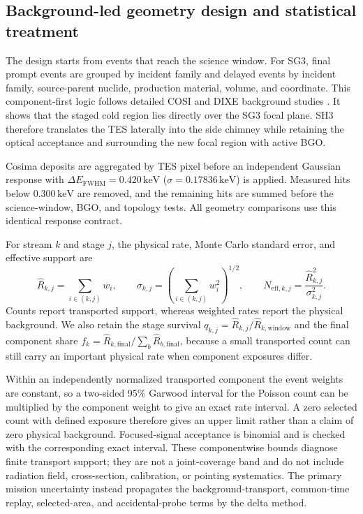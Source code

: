 \documentclass[11pt]{article}
\newcommand{\keV}{\ensuremath{\,\mathrm{keV}}}
\begin{document}
\subsection{Background-led geometry design and statistical treatment}
\label{subsec:comparison_hierarchy}

The design starts from events that reach the science window. For SG3, final
prompt events are grouped by incident family and delayed events by incident
family, source-parent nuclide, production material, volume, and coordinate. This
component-first logic follows detailed COSI and DIXE background studies
\cite{Gallego2025Balloon,Tian2026DIXE}. It shows that the staged cold region lies
directly over the SG3 focal plane. SH3 therefore translates the TES laterally
into the side chimney while retaining the optical acceptance and surrounding the
new focal region with active BGO.

Cosima deposits are aggregated by TES pixel before an independent Gaussian
response with $\Delta E_{\mathrm{FWHM}}=0.420\keV$
($\sigma=0.17836\keV$) is applied. Measured hits below 0.300\keV{} are removed,
and the remaining hits are summed before the science-window, BGO, and topology
tests. All geometry comparisons use this identical response contract.

For stream $k$ and stage $j$, the physical rate, Monte Carlo standard error, and
effective support are
\begin{equation}
  \widehat R_{k,j}=\sum_{i\in(k,j)}w_i,\qquad
  \sigma_{k,j}=\left(\sum_{i\in(k,j)}w_i^2\right)^{1/2},\qquad
  N_{\mathrm{eff},k,j}=\frac{\widehat R_{k,j}^2}{\sigma_{k,j}^2}.
  \label{eq:weighted_rate_stats}
\end{equation}
Counts report transported support, whereas weighted rates report the physical
background. We also retain the stage survival
$q_{k,j}=\widehat R_{k,j}/\widehat R_{k,\mathrm{window}}$ and the final component
share $f_k=\widehat R_{k,\mathrm{final}}/\sum_b\widehat
R_{b,\mathrm{final}}$, because a small transported count can still carry an
important physical rate when component exposures differ.

Within an independently normalized transported component the event weights are
constant, so a two-sided 95\% Garwood interval for the Poisson count can be
multiplied by the component weight to give an exact rate interval. A zero selected
count with defined exposure therefore gives an upper limit rather than a claim of
zero physical background. Focused-signal acceptance is binomial and is checked
with the corresponding exact interval. These componentwise bounds diagnose finite
transport support; they are not a joint-coverage band and do not include radiation
field, cross-section, calibration, or pointing systematics. The primary mission
uncertainty instead propagates the background-transport, common-time replay,
selected-area, and accidental-probe terms by the delta method.
\end{document}
